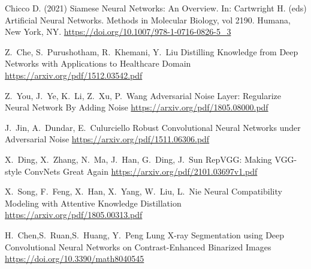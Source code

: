 \documentclass[journal, a4paper]{IEEEtran}
\begin{document}
\begin{thebibliography}{5}
			    
	Chicco D. (2021) Siamese Neural Networks: An Overview. In: Cartwright H. (eds) Artificial Neural Networks. Methods in Molecular Biology, vol 2190. Humana, New York, NY. 
	\url{https://doi.org/10.1007/978-1-0716-0826-5_3}
			    
			    
	Z.~Che, S.~Purushotham, R.~Khemani, Y.~Liu
	Distilling Knowledge from Deep Networks with Applications to Healthcare Domain
	\url{https://arxiv.org/pdf/1512.03542.pdf}
			    
			    
	Z.~You, J.~Ye, K.~Li, Z.~Xu, P.~Wang
	Adversarial Noise Layer: Regularize Neural Network By Adding Noise
	\url{https://arxiv.org/pdf/1805.08000.pdf}
			    
			    
	J.~Jin, A.~Dundar, E.~Culurciello
	Robust Convolutional Neural Networks under Adversarial Noise
	\url{https://arxiv.org/pdf/1511.06306.pdf}
		
		
	X.~Ding, X.~Zhang, N.~Ma, J.~Han, G.~Ding, J.~Sun
	RepVGG: Making VGG-style ConvNets Great Again
	\url{https://arxiv.org/pdf/2101.03697v1.pdf}
		
	X.~Song, F.~Feng, X.~Han, X.~Yang, W.~Liu, L.~Nie
	Neural Compatibility Modeling with Attentive Knowledge Distillation
	\url{https://arxiv.org/pdf/1805.00313.pdf}
	
	H.~Chen,S.~Ruan,S.~Huang, Y.~Peng
	Lung X-ray Segmentation using Deep Convolutional Neural Networks on Contrast-Enhanced Binarized Images
	\url{https://doi.org/10.3390/math8040545}
	
			
\end{thebibliography}

\clearpage
\end{document}
